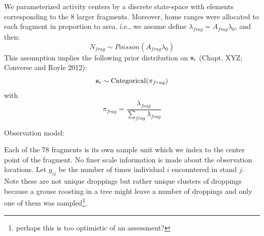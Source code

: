 We parameterized activity centers by a discrete state-space with elements
corresponding to the 8 larger fragments. Moreover, home ranges were allocated
to each fragment in  proportion to area. i.e., we assume
define $\lambda_{frag} = A_{frag} \lambda_{0}$, and then:
\[
 N_{frag} \sim Poisson( A_{frag} \lambda_{0} )
\]
This assumption implies the following prior distribution on ${\bf s}_{i}$ (Chapt.
XYZ; Converse and Royle 2012):
\[
{\bf s}_{i} \sim  \mbox{Categorical}(  \pi_{frag} ) 
\]
with
\[ 
 \pi_{frag} = \frac{ \lambda_{frag} }{\sum_{frag} \lambda_{frag}}
\]


Observation model:  

Each of the 78 fragments is its own sample unit which we index to the
center point of the fragment. No finer scale information is made about
the observation locations. 
Let $y_{ij}$ be  the number of times individual $i$ encountered in stand $j$.
Note these are not unique droppings but rather unique clusters of
droppings because a grouse roosting in a tree might leave a number of
droppings and only one of them was sampled\footnote{perhaps this is
  too optimistic of an assessment?}. 






